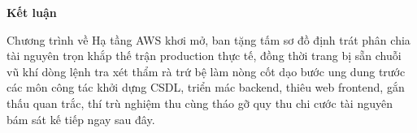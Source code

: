 \vspace{0.5em}\noindent\textbf{Kết luận}\par

Chương trình về Hạ tầng AWS khơi mở, ban tặng tấm sơ đồ định trát phân
chia tài nguyên trọn khắp thế trận production thực tế, đồng thời trang
bị sẵn chuỗi vũ khí dòng lệnh tra xét thẩm rà trứ bệ làm nòng cốt dạo
bước ung dung trước các môn công tác khởi dựng CSDL, triển mác backend,
thiêu web frontend, gắn thấu quan trắc, thí trù nghiệm thu cùng tháo gỡ
quy thu chi cước tài nguyên bám sát kế tiếp ngay sau đây.
